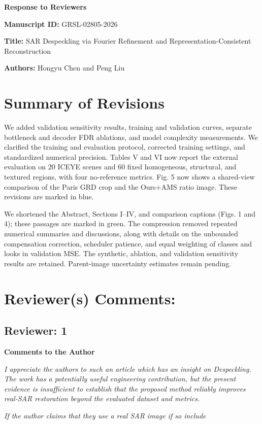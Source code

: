 \documentclass[11pt,letterpaper]{article}
\newcommand{\reviewgroup}[1]{%
  \Needspace{5\baselineskip}%
  \medskip\textit{#1}\par
}
\begin{document}
{\Large\bfseries Response to Reviewers}\par
\textbf{Manuscript ID:} GRSL-02805-2026\par
\textbf{Title:} SAR Despeckling via Fourier Refinement and Representation-Consistent Reconstruction\par
\textbf{Authors:} Hongyu Chen and Peng Liu

\section*{Summary of Revisions}
We added validation sensitivity results, training and validation curves, separate bottleneck and decoder FDR ablations, and model complexity measurements. We clarified the training and evaluation protocol, corrected training settings, and standardized numerical precision. Tables V and VI now report the external evaluation on 20 ICEYE scenes and 60 fixed homogeneous, structural, and textured regions, with four no-reference metrics. Fig. 5 now shows a shared-view comparison of the Paris GRD crop and the Ours+AMS ratio image. These revisions are marked in blue.

We shortened the Abstract, Sections I--IV, and comparison captions (Figs. 1 and 4); these passages are marked in green. The compression removed repeated numerical summaries and discussions, along with details on the unbounded compensation correction, scheduler patience, and equal weighting of classes and looks in validation MSE. The synthetic, ablation, and validation sensitivity results are retained. Parent-image uncertainty estimates remain pending.

\section*{Reviewer(s) Comments:}
\subsection*{Reviewer: 1}
\textbf{Comments to the Author}

\textit{I appreciate the authors to such an article which has an insight on Despeckling. The work has a potentially useful engineering contribution, but the present evidence is insufficient to establish that the proposed method reliably improves real-SAR restoration beyond the evaluated dataset and metrics.}

\reviewgroup{If the author claims that they use a real SAR image if so include}
\end{document}
